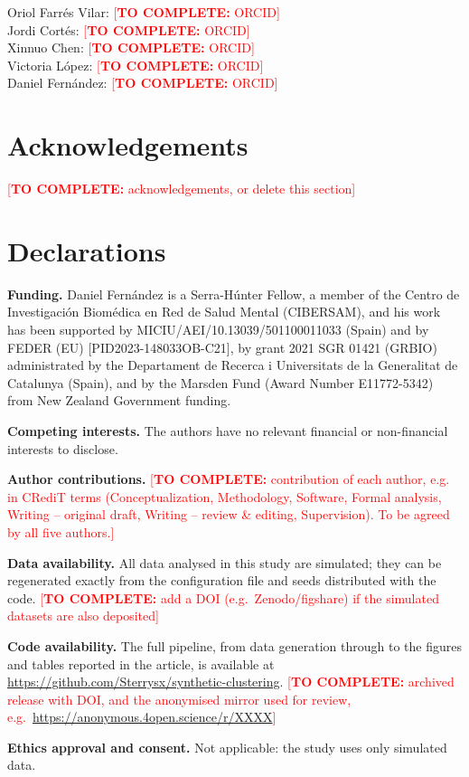 \documentclass[pdflatex,referee]{sn-jnl}
\newcommand\TODO[1]{\textcolor{red}{[\textbf{TO COMPLETE:} #1]}}
\begin{document}
\noindent
Oriol Farr\'es Vilar: \TODO{ORCID}\\
Jordi Cort\'es: \TODO{ORCID}\\
Xinnuo Chen: \TODO{ORCID}\\
Victoria L\'opez: \TODO{ORCID}\\
Daniel Fern\'andez: \TODO{ORCID}

\section*{Acknowledgements}

\noindent\TODO{acknowledgements, or delete this section}

\section*{Declarations}

\noindent\textbf{Funding.} Daniel Fern\'andez is a Serra-H\'unter Fellow, a member of the Centro de Investigaci\'on Biom\'edica en Red de Salud Mental (CIBERSAM), and his work has been supported by MICIU/AEI/10.13039/501100011033 (Spain) and by FEDER (EU) [PID2023-148033OB-C21], by grant 2021 SGR 01421 (GRBIO) administrated by the Departament de Recerca i Universitats de la Generalitat de Catalunya (Spain), and by the Marsden Fund (Award Number E11772-5342) from New Zealand Government funding.

\medskip
\noindent\textbf{Competing interests.} The authors have no relevant financial or non-financial interests to disclose.

\medskip
\noindent\textbf{Author contributions.} \TODO{contribution of each author,
e.g. in CRediT terms (Conceptualization, Methodology, Software, Formal
analysis, Writing -- original draft, Writing -- review \& editing,
Supervision). To be agreed by all five authors.}

\medskip
\noindent\textbf{Data availability.} All data analysed in this study are
simulated; they can be regenerated exactly from the configuration file and
seeds distributed with the code. \TODO{add a DOI (e.g.\ Zenodo/figshare) if the
simulated datasets are also deposited}

\medskip
\noindent\textbf{Code availability.} The full pipeline, from data generation
through to the figures and tables reported in the article, is available at
\url{https://github.com/Sterrysx/synthetic-clustering}. \TODO{archived release
with DOI, and the anonymised mirror used for review, e.g.\
\url{https://anonymous.4open.science/r/XXXX}}

\medskip
\noindent\textbf{Ethics approval and consent.} Not applicable: the study uses
only simulated data.
\end{document}
